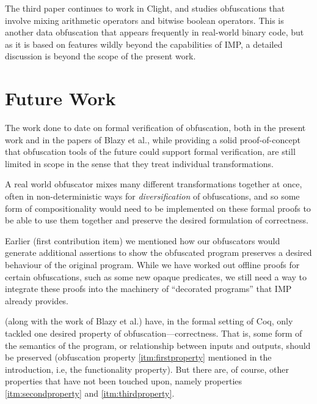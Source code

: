 \documentclass[compsoc,conference,a4paper,10pt,times]{IEEEtran}
\begin{document}
The third paper
\cite{Blazy3} continues to work in Clight, and studies obfuscations that involve mixing arithmetic operators and bitwise boolean operators.  This is another data obfuscation that appears frequently in real-world binary code, but as it is based on features wildly beyond the capabilities of IMP, a detailed discussion is beyond the scope of the present work.

\section{Future Work}
The work done to date on formal verification of obfuscation, both in the present work and in the papers of Blazy et al., while providing a solid proof-of-concept that obfuscation tools of the future could support formal verification, are still limited in scope in the sense that they treat individual transformations.

A real world obfuscator mixes many different transformations together at once, often in non-deterministic ways for \emph{diversification} of obfuscations, and so some form of compositionality would need to be implemented on these formal proofs to be able to use them together and preserve the desired formulation of correctness. 

Earlier (first contribution item) we mentioned how our obfuscators would generate additional assertions to show the obfuscated program preserves a desired behaviour of the original program. While we have worked out offline proofs for certain obfuscations, such as some new opaque predicates, we still need a way to integrate these proofs into the machinery of ``decorated programs'' that IMP already provides. 

(along with the work of Blazy et al.)
have, in the formal setting of Coq, only tackled one desired property of obfuscation---correctness.  That is, some form of the semantics of the program, or relationship between inputs and outputs, should be preserved (obfuscation property \ref{itm:firstproperty} mentioned in the introduction, i.e, the functionality property). But there are, of course, other properties that have not been touched upon, namely properties \ref{itm:secondproperty} and \ref{itm:thirdproperty}.
\end{document}
